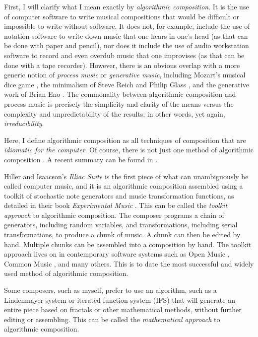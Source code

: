 \documentclass[11pt]{amsart}
\begin{document}
First, I will clarify what I mean exactly by \emph{algorithmic composition}. It is the use of computer software to write musical compositions that would be difficult or impossible to write without software. It does not, for example, include the use of notation software to write down music that one hears in one's head (as that can be done with paper and pencil), nor does it include the use of audio workstation software to record and even overdub music that one improvises (as that can be done with a tape recorder). However, there is an obvious overlap with a more generic notion of \emph{process music} or \emph{generative music}, including Mozart's musical dice game \cite{humdrumdice}, the minimalism of Steve Reich \cite{reichprocess, 10.2307/832600} and Philip Glass \cite{potter2002four, glass2015words}, and the generative work of Brian Eno \cite{eno1996generative}. The commonality between algorithmic composition and process music is precisely the simplicity and clarity of the means versus the complexity and unpredictability of the results; in other words, yet again, \emph{irreducibility}. 

Here, I define algorithmic composition as all techniques of composition that are \emph{idiomatic for the computer}. Of course, there is not just one method of algorithmic composition \cite{fernandez2013ai, arizanet}. A recent summary can be found in \cite{mclean2018oxford}.

Hiller and Isaacson's \emph{Illiac Suite} \cite{illiacsuite} is the first piece of what can unambiguously be called computer music, and it is an algorithmic composition assembled using a toolkit of stochastic note generators and music transformation functions, as detailed in their book \emph{Experimental Music} \cite{hiller}. This can be called the \emph{toolkit approach} to algorithmic composition. The composer programs a chain of generators, including random variables, and transformations, including serial transformations, to produce a chunk of music. A chunk can then be edited by hand. Multiple chunks can be assembled into a composition by hand. The toolkit approach lives on in contemporary software systems such as Open Music \cite{OpenMusic}, Common Music \cite{musx}, and many others. This is to date the most successful and widely used method of algorithmic composition.

Some composers, such as myself, prefer to use an algorithm, such as a Lindenmayer system \cite{algorithmicbeautyofplants, prusinkiewicz1986sgs,  fractalmusicwithstringrewritinggrammars} or iterated function system (IFS) \cite{fractalseverywhere, ifsmusic} that will generate an entire piece based on fractals or other mathematical methods, without further editing or assembling. This can be called the \emph{mathematical approach} to algorithmic composition.
\end{document}
